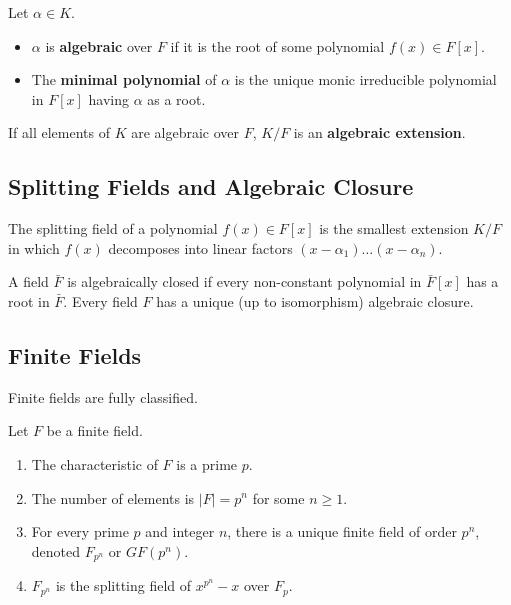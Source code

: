 \documentclass[oneside]{book}
\begin{document}
\begin{definition}
Let $\alpha \in K$.
\begin{itemize}
    \item $\alpha$ is \textbf{algebraic} over $F$ if it is the root of some polynomial $f(x) \in F[x]$.
    \item The \textbf{minimal polynomial} of $\alpha$ is the unique monic irreducible polynomial in $F[x]$ having $\alpha$ as a root.
\end{itemize}
If all elements of $K$ are algebraic over $F$, $K/F$ is an \textbf{algebraic extension}.
\end{definition}

\subsection{Splitting Fields and Algebraic Closure}

\begin{definition}
The splitting field of a polynomial $f(x) \in F[x]$ is the smallest extension $K/F$ in which $f(x)$ decomposes into linear factors $(x-\alpha_1)\dots(x-\alpha_n)$.
\end{definition}

\begin{definition}
A field $\bar{F}$ is algebraically closed if every non-constant polynomial in $\bar{F}[x]$ has a root in $\bar{F}$. Every field $F$ has a unique (up to isomorphism) algebraic closure.
\end{definition}

\newpage

\subsection{Finite Fields}

Finite fields are fully classified.
\begin{theorem}
Let $F$ be a finite field.
\begin{enumerate}
    \item The characteristic of $F$ is a prime $p$.
    \item The number of elements is $|F| = p^n$ for some $n \geq 1$.
    \item For every prime $p$ and integer $n$, there is a unique finite field of order $p^n$, denoted $F_{p^n}$ or $GF(p^n)$.
    \item $F_{p^n}$ is the splitting field of $x^{p^n} - x$ over $F_p$.
\end{enumerate}
\end{theorem}
\end{document}
